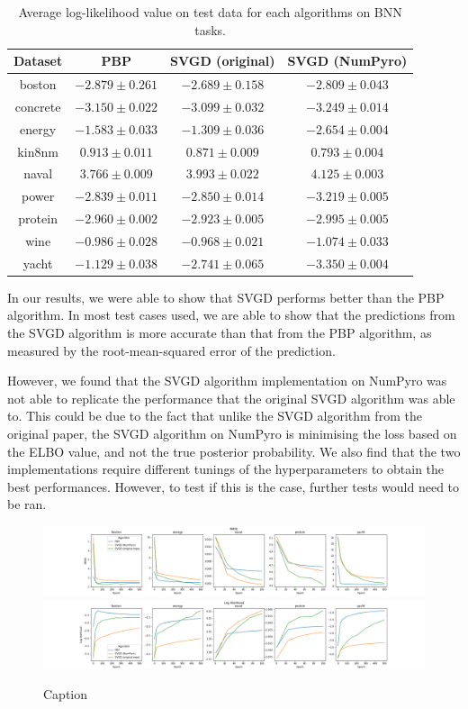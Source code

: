 \begin{table}[]
\centering
\caption{Average log-likelihood value on test data for each algorithms on BNN tasks.} 
\label{tab:bnn_logl}
\begin{tabular}{|c|ccc|}
\hline
 Dataset & PBP & SVGD (original) & SVGD (NumPyro)  \\
 \hline
boston & $-2.879 \pm 0.261$ & $-2.689 \pm 0.158$ & $-2.809 \pm 0.043$ \\
concrete & $-3.150 \pm 0.022$ & $-3.099 \pm 0.032$ & $-3.249 \pm 0.014$ \\
energy & $-1.583 \pm 0.033$ & $-1.309 \pm 0.036$ & $-2.654 \pm 0.004$ \\
kin8nm & $0.913 \pm 0.011$ & $0.871 \pm 0.009$ & $0.793 \pm 0.004$ \\
naval & $3.766 \pm 0.009$ & $3.993 \pm 0.022$ & $4.125 \pm 0.003$ \\
power & $-2.839 \pm 0.011$ & $-2.850 \pm 0.014$ & $-3.219 \pm 0.005$ \\
protein & $-2.960 \pm 0.002$ & $-2.923 \pm 0.005$ & $-2.995 \pm 0.005$ \\
wine & $-0.986 \pm 0.028$ & $-0.968 \pm 0.021$ & $-1.074 \pm 0.033$ \\
yacht & $-1.129 \pm 0.038$ & $-2.741 \pm 0.065$ & $-3.350 \pm 0.004$ \\
\hline
\end{tabular}
\end{table}

In our results, we were able to show that SVGD performs better than the PBP algorithm. In most test cases used, we are able to show that the predictions from the SVGD algorithm is more accurate than that from the PBP algorithm, as measured by the root-mean-squared error of the prediction. 

However, we found that the SVGD algorithm implementation on NumPyro was not able to replicate the performance that the original SVGD algorithm was able to. This could be due to the fact that unlike the SVGD algorithm from the original paper, the SVGD algorithm on NumPyro is minimising the loss based on the ELBO value, and not the true posterior probability. We also find that the two implementations require different tunings of the hyperparameters to obtain the best performances. However, to test if this is the case, further tests would need to be ran.

\begin{figure}[h]
    \centering
    \includegraphics[width=\textwidth]{figs/bayesian_epoch_RMSE.png}
    \includegraphics[width=\textwidth]{figs/bayesian_epoch_Loglikelihood.png}
    \caption{Caption}
    \label{fig:my_label}
\end{figure}